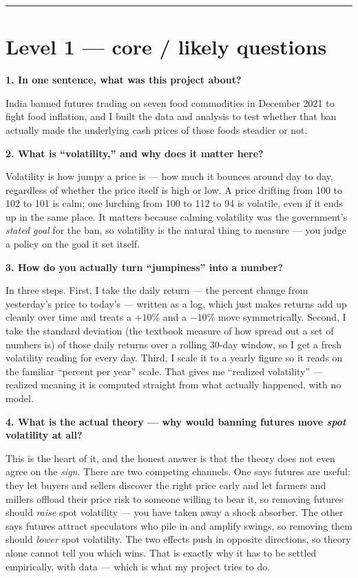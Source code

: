 \documentclass[11pt]{article}
\newcommand{\Q}[1]{\medskip\noindent\textbf{#1}\par}
\newcommand{\A}{\noindent}
\begin{document}
\bigskip
\hrule

\section{Level 1 --- core / likely questions}

\Q{1. In one sentence, what was this project about?}
\A India banned futures trading on seven food commodities in December 2021 to fight food inflation,
and I built the data and analysis to test whether that ban actually made the underlying cash prices
of those foods steadier or not.

\Q{2. What is ``volatility,'' and why does it matter here?}
\A Volatility is how jumpy a price is --- how much it bounces around day to day, regardless of
whether the price itself is high or low. A price drifting from 100 to 102 to 101 is calm; one
lurching from 100 to 112 to 94 is volatile, even if it ends up in the same place. It matters because
calming volatility was the government's \emph{stated goal} for the ban, so volatility is the natural
thing to measure --- you judge a policy on the goal it set itself.

\Q{3. How do you actually turn ``jumpiness'' into a number?}
\A In three steps. First, I take the daily return --- the percent change from yesterday's price to
today's --- written as a log, which just makes returns add up cleanly over time and treats a $+10\%$
and a $-10\%$ move symmetrically. Second, I take the standard deviation (the textbook measure of how
spread out a set of numbers is) of those daily returns over a rolling 30-day window, so I get a
fresh volatility reading for every day. Third, I scale it to a yearly figure so it reads on the
familiar ``percent per year'' scale. That gives me ``realized volatility'' --- realized meaning it
is computed straight from what actually happened, with no model.

\Q{4. What is the actual theory --- why would banning futures move \emph{spot} volatility at all?}
\A This is the heart of it, and the honest answer is that the theory does not even agree on the
\emph{sign}. There are two competing channels. One says futures are useful: they let buyers and
sellers discover the right price early and let farmers and millers offload their price risk to
someone willing to bear it, so removing futures should \emph{raise} spot volatility --- you have
taken away a shock absorber. The other says futures attract speculators who pile in and amplify
swings, so removing them should \emph{lower} spot volatility. The two effects push in opposite
directions, so theory alone cannot tell you which wins. That is exactly why it has to be settled
empirically, with data --- which is what my project tries to do.
\end{document}
